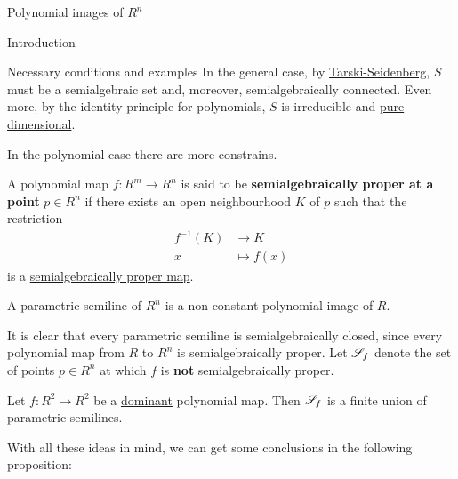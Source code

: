 \documentclass[11pt, a4paper, english, twoside, notitlepage]{report}
\begin{document}
\begin{chapter}{Polynomial images of $R^n$}
\begin{section}{Introduction}
\begin{subsection}{Necessary conditions and examples}
	In the general case, by \hyperref[tarskiSeidenberg]{Tarski-Seidenberg}, $S$ must be a semialgebraic set and, moreover, semialgebraically connected. Even more, by the identity principle for polynomials, $S$ is irreducible and \hyperref[pureDim]{pure dimensional}.
	
	
	In the polynomial case there are more constrains.
	
	\begin{definition}
		
		A polynomial map $f: R^m \longrightarrow R^n$ is said to be \textbf{semialgebraically proper at a point} $p \in R^n$ if there exists an open neighbourhood $K$ of $p$ such that the restriction 
		\begin{align*}
			f^{-1}(K) & \longrightarrow K\\
			x & \longmapsto f(x)
		\end{align*}
		is a \hyperref[properMap]{semialgebraically proper map}.
		
	\end{definition}
	
	\begin{definition}
		
		A parametric semiline  of $R^n$ is a non-constant polynomial image of $R$.
		
	\end{definition}
	
	It is clear that every parametric semiline is semialgebraically closed, since every polynomial map from $R$ to $R^n$ is semialgebraically proper. Let $\S_f$ denote the set of points $p \in R^n$ at which $f$ is \textbf{not} semialgebraically proper.
	
	\begin{theorem}[Jelonek]\label{jelonek}
		
		Let $f: R^2 \longrightarrow R^2$ be a \hyperref[dominant]{dominant} polynomial map. Then $\S_f$ is a finite union of parametric semilines.
		
	\end{theorem}
	
	With all these ideas in mind, we can get some conclusions in the following proposition:
	
	\begin{proposition}\label{propIntro}
			

\end{proposition}
\end{subsection}
\end{section}
\end{chapter}
\end{document}

